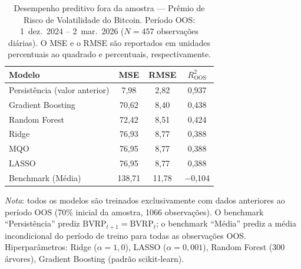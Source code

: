 \begin{table}[H]
\centering
\small
\caption{Desempenho preditivo fora da amostra --- Prêmio de Risco de Volatilidade do Bitcoin.
Período OOS\@: 1~dez.\ 2024 -- 2~mar.\ 2026 ($N=457$ observações diárias).
O MSE e o RMSE são reportados em unidades percentuais ao quadrado e percentuais, respectivamente.}
\label{tab:cap8_oos_performance}
\begin{tabular}{lccc}
\toprule
Modelo & MSE & RMSE & $R^2_{\text{OOS}}$ \\
\midrule
Persistência (valor anterior) & 7,98 & 2,82 & 0,937 \\
Gradient Boosting & 70,62 & 8,40 & 0,438 \\
Random Forest & 72,42 & 8,51 & 0,424 \\
Ridge & 76,93 & 8,77 & 0,388 \\
MQO & 76,95 & 8,77 & 0,388 \\
LASSO & 76,95 & 8,77 & 0,388 \\
\midrule
Benchmark (Média) & 138,71 & 11,78 & $-$0,104 \\
\bottomrule
\end{tabular}
\par\smallskip
\footnotesize\textit{Nota}: todos os modelos são treinados exclusivamente com dados anteriores ao período OOS (70\% inicial da amostra, 1066 observações). O benchmark ``Persistência'' prediz $\text{BVRP}_{t+1}=\text{BVRP}_t$; o benchmark ``Média'' prediz a média incondicional do período de treino para todas as observações OOS. Hiperparâmetros: Ridge ($\alpha=1{,}0$), LASSO ($\alpha=0{,}001$), Random Forest (300 árvores), Gradient Boosting (padrão scikit-learn).
\end{table}